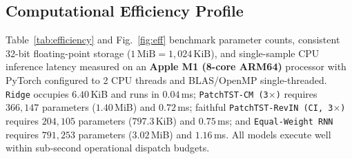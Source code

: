 \documentclass[5p,twocolumn,authoryear]{elsarticle}
\begin{document}
\FloatBarrier

\subsection{Computational Efficiency Profile}
Table~\ref{tab:efficiency} and Fig.~\ref{fig:eff} benchmark parameter counts, consistent 32-bit floating-point storage ($1\,\text{MiB} = 1,024\,\text{KiB}$), and single-sample CPU inference latency measured on an \textbf{Apple M1 (8-core ARM64)} processor with PyTorch configured to 2 CPU threads and BLAS/OpenMP single-threaded. \texttt{Ridge} occupies $6.40$\,KiB and runs in $0.04$\,ms; \texttt{PatchTST-CM (3$\times$)} requires $366,147$ parameters ($1.40$\,MiB) and $0.72$\,ms; faithful \texttt{PatchTST-RevIN (CI, 3$\times$)} requires $204,105$ parameters ($797.3$\,KiB) and $0.75$\,ms; and \texttt{Equal-Weight RNN} requires $791,253$ parameters ($3.02$\,MiB) and $1.16$\,ms. All models execute well within sub-second operational dispatch budgets.

\begin{table}[t]
\centering
\caption{Computational efficiency profile measured on Apple M1 (8-core ARM64; PyTorch 2 CPU threads, BLAS/OpenMP single-threaded). Memory assumes 32-bit floating-point weights ($1\,\text{MiB} = 1,024\,\text{KiB}$).}
\label{tab:efficiency}
\end{table}
\end{document}
